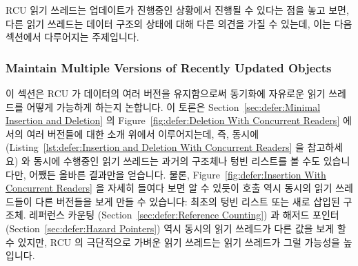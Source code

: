RCU 읽기 쓰레드는 업데이트가 진행중인 상황에서 진행될 수 있다는 점을 놓고 보면,
다른 읽기 쓰레드는 데이터 구조의 상태에 대해 다른 의견을 가질 수 있는데, 이는
다음 섹션에서 다루어지는 주제입니다.

\subsubsection{Maintain Multiple Versions of Recently Updated Objects}
\label{sec:defer:Maintain Multiple Versions of Recently Updated Objects}

이 섹션은 RCU 가 데이터의 여러 버전을 유지함으로써 동기화에 자유로운 읽기
쓰레드를 어떻게 가능하게 하는지 논합니다.
이 토론은
Section~\ref{sec:defer:Minimal Insertion and Deletion} 의
Figure~\ref{fig:defer:Deletion With Concurrent Readers}
에서의 여러 버전들에 대한 소개 위에서 이루어지는데, 즉, 동시에 
(Listing~\ref{lst:defer:Insertion and Deletion With Concurrent Readers} 을
참고하세요) 와 동시에 수행중인 읽기 쓰레드는 과거의  구조체나 텅빈
리스트를 볼 수도 있습니다만, 어쨌든 올바른 결과만을 얻습니다.
물론, Figure~\ref{fig:defer:Insertion With Concurrent Readers} 을 자세히 들여다
보면 알 수 있듯이  호출 역시 동시의 읽기 쓰레드들이 다른
버전들을 보게 만들 수 있습니다: 최초의 텅빈 리스트 또는 새로 삽입된 
구조체.
레퍼런스 카운팅
(Section~\ref{sec:defer:Reference Counting})
과 해저드 포인터
(Section~\ref{sec:defer:Hazard Pointers})
역시 동시의 읽기 쓰레드가 다른 값을 보게 할 수 있지만, RCU 의 극단적으로 가벼운
읽기 쓰레드는 읽기 쓰레드가 그럴 가능성을 높입니다.

